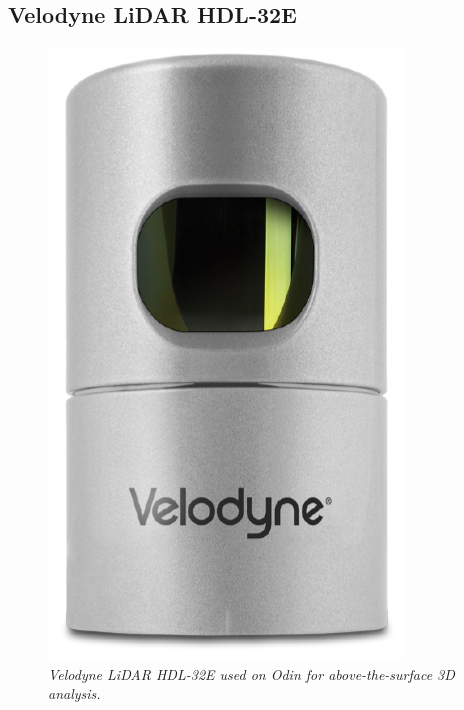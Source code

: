 \subsection{Velodyne LiDAR HDL-32E}
\begin{figure}
	\vspace{-30pt}
	\begin{center}
		\includegraphics[width= 0.9\linewidth]{fig/VelodyneHDL32Ecase}
		\vspace{-20pt}
		\caption{\it{Velodyne LiDAR HDL-32E used on Odin for above-the-surface 3D analysis.}}
		\label{fig:velodyneCasing}
	\end{center}
	
\end{figure}
